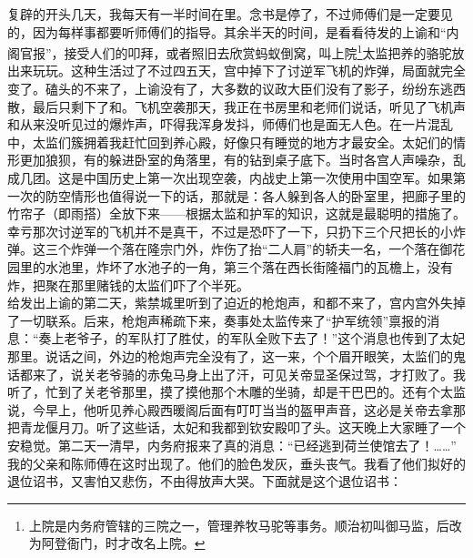 复辟的开头几天，我每天有一半时间在里。念书是停了，不过师傅们是一定要见的，因为每样事都要听师傅们的指导。其余半天的时间，是看看待发的上谕和“内阁官报”，接受人们的叩拜，或者照旧去欣赏蚂蚁倒窝，叫上院\footnote{上院是内务府管辖的三院之一，管理养牧马驼等事务。顺治初叫御马监，后改为阿登衙门，时才改名上院。}太监把养的骆驼放出来玩玩。这种生活过了不过四五天，宫中掉下了讨逆军飞机的炸弹，局面就完全变了。磕头的不来了，上谕没有了，大多数的议政大臣们没有了影子，纷纷东逃西散，最后只剩下了和。飞机空袭那天，我正在书房里和老师们说话，听见了飞机声和从来没听见过的爆炸声，吓得我浑身发抖，师傅们也是面无人色。在一片混乱中，太监们簇拥着我赶忙回到养心殿，好像只有睡觉的地方才最安全。太妃们的情形更加狼狈，有的躲进卧室的角落里，有的钻到桌子底下。当时各宫人声噪杂，乱成几团。这是中国历史上第一次出现空袭，内战史上第一次使用中国空军。如果第一次的防空情形也值得说一下的话，那就是：各人躲到各人的卧室里，把廊子里的竹帘子（即雨搭）全放下来——根据太监和护军的知识，这就是最聪明的措施了。幸亏那次讨逆军的飞机并不是真干，不过是恐吓了一下，只扔下三个尺把长的小炸弹。这三个炸弹一个落在隆宗门外，炸伤了抬“二人肩”的轿夫一名，一个落在御花园里的水池里，炸坏了水池子的一角，第三个落在西长街隆福门的瓦檐上，没有炸，把聚在那里赌钱的太监们吓了个半死。\\

给发出上谕的第二天，紫禁城里听到了迫近的枪炮声，和都不来了，宫内宫外失掉了一切联系。后来，枪炮声稀疏下来，奏事处太监传来了“护军统领”禀报的消息：“奏上老爷子，的军队打了胜仗，的军队全败下去了！”这个消息也传到了太妃那里。说话之间，外边的枪炮声完全没有了，这一来，个个眉开眼笑，太监们的鬼话都来了，说关老爷骑的赤兔马身上出了汗，可见关帝显圣保过驾，才打败了。我听了，忙到了关老爷那里，摸了摸他那个木雕的坐骑，却是干巴巴的。还有个太监说，今早上，他听见养心殿西暖阁后面有叮叮当当的盔甲声音，这必是关帝去拿那把青龙偃月刀。听了这些话，太妃和我都到钦安殿叩了头。这天晚上大家睡了一个安稳觉。第二天一清早，内务府报来了真的消息：“已经逃到荷兰使馆去了！……”\\

我的父亲和陈师傅在这时出现了。他们的脸色发灰，垂头丧气。我看了他们拟好的退位诏书，又害怕又悲伤，不由得放声大哭。下面就是这个退位诏书：\\


